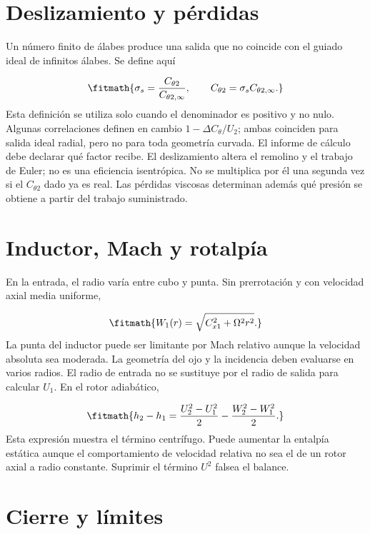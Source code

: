 \documentclass[10pt,openany]{book}
\begin{document}
\section{Deslizamiento y pérdidas}

Un número finito de álabes produce una salida que no coincide con el guiado ideal de infinitos álabes. Se define aquí

\[
\fitmath{\sigma_s=\frac{C_{\theta2}}{C_{\theta2,\infty}},\qquad
C_{\theta2}=\sigma_s C_{\theta2,\infty}.}
\]
Esta definición se utiliza solo cuando el denominador es positivo y no nulo. Algunas correlaciones definen en cambio \(1-\Delta C_\theta/U_2\); ambas coinciden para salida ideal radial, pero no para toda geometría curvada. El informe de cálculo debe declarar qué factor recibe.
El deslizamiento altera el remolino y el trabajo de Euler; no es una eficiencia isentrópica. No se multiplica por él una segunda vez si el \(C_{\theta2}\) dado ya es real. Las pérdidas viscosas determinan además qué presión se obtiene a partir del trabajo suministrado.

\section{Inductor, Mach y rotalpía}

En la entrada, el radio varía entre cubo y punta. Sin prerrotación y con velocidad axial media uniforme,

\[
\fitmath{W_1(r)=\sqrt{C_{x1}^2+\Omega^2r^2}.}
\]
La punta del inductor puede ser limitante por Mach relativo aunque la velocidad absoluta sea moderada. La geometría del ojo y la incidencia deben evaluarse en varios radios. El radio de entrada no se sustituye por el radio de salida para calcular \(U_1\).
En el rotor adiabático,

\[
\fitmath{h_2-h_1=\frac{U_2^2-U_1^2}{2}-\frac{W_2^2-W_1^2}{2}.}
\]
Esta expresión muestra el término centrífugo. Puede aumentar la entalpía estática aunque el comportamiento de velocidad relativa no sea el de un rotor axial a radio constante. Suprimir el término \(U^2\) falsea el balance.

\section{Cierre y límites}
\end{document}
